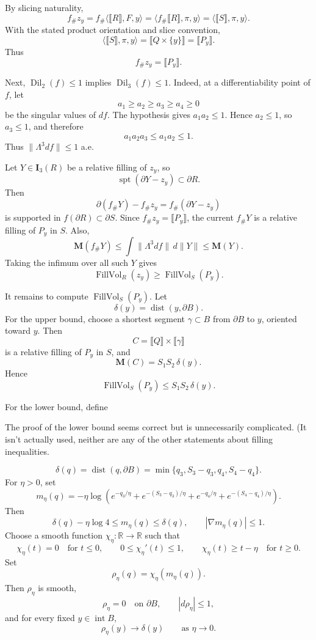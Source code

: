 \documentclass[12pt]{article}
\newcommand{\review}[1]{\begin{reviewbox}#1\end{reviewbox}}
\begin{document}
By slicing naturality,
\[
f_\# z_y
=
f_\#\langle \llbracket R\rrbracket,F,y\rangle
=
\langle f_\#\llbracket R\rrbracket,\pi,y\rangle
=
\langle \llbracket S\rrbracket,\pi,y\rangle .
\]
With the stated product orientation and slice convention,
\[
\langle \llbracket S\rrbracket,\pi,y\rangle
=
\llbracket Q\times\{y\}\rrbracket
=
\llbracket P_y\rrbracket.
\]
Thus
\[
f_\#z_y=\llbracket P_y\rrbracket.
\]

Next, \(\operatorname{Dil}_2(f)\le 1\) implies \(\operatorname{Dil}_3(f)\le 1\). Indeed, at a differentiability point of \(f\), let
\[
a_1\ge a_2\ge a_3\ge a_4\ge 0
\]
be the singular values of \(df\). The hypothesis gives \(a_1a_2\le 1\). Hence \(a_2\le 1\), so \(a_3\le 1\), and therefore
\[
a_1a_2a_3\le a_1a_2\le 1.
\]
Thus \(\|\Lambda^3df\|\le 1\) a.e.

Let \(Y\in \mathbf I_3(R)\) be a relative filling of \(z_y\), so
\[
\operatorname{spt}(\partial Y-z_y)\subset \partial R.
\]
Then
\[
\partial(f_\#Y)-f_\#z_y
=
f_\#(\partial Y-z_y)
\]
is supported in \(f(\partial R)\subset \partial S\). Since \(f_\#z_y=\llbracket P_y\rrbracket\), the current \(f_\#Y\) is a relative filling of \(P_y\) in \(S\). Also,
\[
\mathbf M(f_\#Y)\le \int \|\Lambda^3df\|\,d\|Y\|\le \mathbf M(Y).
\]
Taking the infimum over all such \(Y\) gives
\[
\operatorname{FillVol}_R(z_y)\ge \operatorname{FillVol}_S(P_y).
\]

It remains to compute \(\operatorname{FillVol}_S(P_y)\). Let
\[
\delta(y)=\operatorname{dist}(y,\partial B).
\]
For the upper bound, choose a shortest segment \(\gamma\subset B\) from \(\partial B\) to \(y\), oriented toward \(y\). Then
\[
C=\llbracket Q\rrbracket\times \llbracket \gamma\rrbracket
\]
is a relative filling of \(P_y\) in \(S\), and
\[
\mathbf M(C)=S_1S_2\,\delta(y).
\]
Hence
\[
\operatorname{FillVol}_S(P_y)\le S_1S_2\,\delta(y).
\]

For the lower bound, define \review{The proof of the lower bound seems correct but is unnecessarily complicated. (It isn't actually used, neither are any of the other statements about filling inequalities.}
\[
\delta(q)=\operatorname{dist}(q,\partial B)
=
\min\{q_3,S_3-q_3,q_4,S_4-q_4\}.
\]
For \(\eta>0\), set
\[
m_\eta(q)
=
-\eta\log\left(
e^{-q_3/\eta}
+
e^{-(S_3-q_3)/\eta}
+
e^{-q_4/\eta}
+
e^{-(S_4-q_4)/\eta}
\right).
\]
Then
\[
\delta(q)-\eta\log 4\le m_\eta(q)\le \delta(q),
\qquad
|\nabla m_\eta(q)|\le 1.
\]
Choose a smooth function \(\chi_\eta:\mathbb R\to\mathbb R\) such that
\[
\chi_\eta(t)=0\quad\text{for }t\le 0,\qquad
0\le \chi_\eta'(t)\le 1,\qquad
\chi_\eta(t)\ge t-\eta\quad\text{for }t\ge 0.
\]
Set
\[
\rho_\eta(q)=\chi_\eta(m_\eta(q)).
\]
Then \(\rho_\eta\) is smooth,
\[
\rho_\eta=0\quad\text{on }\partial B,\qquad |d\rho_\eta|\le 1,
\]
and for every fixed \(y\in\operatorname{int}B\),
\[
\rho_\eta(y)\to \delta(y)
\qquad\text{as }\eta\to 0.
\]
\end{document}
